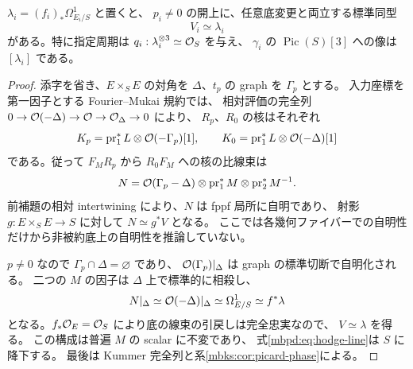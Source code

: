 \begin{lemma}
\label{mbpd:lem:hodge-line}
$\lambda_i=(f_i)_*\Omega^1_{E_i/S}$ と置くと、
$p_i\ne0$ の開上に、任意底変更と両立する標準同型
\begin{equation}\label{mbpd:eq:hodge-line}
 V_i\simeq\lambda_i
\end{equation}
がある。特に指定周期は $q_i:\lambda_i^{\otimes3}\simeq\mathcal O_S$ を与え、
$\gamma_i$ の $\operatorname{Pic}(S)[3]$ への像は $[\lambda_i]$ である。
\end{lemma}
\begin{proof}
添字を省き、$E\times_SE$ の対角を $\Delta$、$t_p$ の graph を $\Gamma_p$ とする。
入力座標を第一因子とする Fourier--Mukai 規約では、
相対評価の完全列
$0\to\mathcal O(-\Delta)\to\mathcal O\to\mathcal O_\Delta\to0$ により、
$R_p$、$R_0$ の核はそれぞれ
\[
 K_p=\operatorname{pr}_1^*L\otimes\mathcal O(-\Gamma_p)[1],
 \qquad K_0=\operatorname{pr}_1^*L\otimes\mathcal O(-\Delta)[1]
\]
である。従って $F_MR_p$ から $R_0F_M$ への核の比線束は
\begin{equation}\label{mbpd:eq:kernel-ratio}
 N=\mathcal O(\Gamma_p-\Delta)\otimes
       \operatorname{pr}_1^*M\otimes\operatorname{pr}_2^*M^{-1}.
\end{equation}
前補題の相対 intertwining により、$N$ は fppf 局所に自明であり、
射影 $g:E\times_SE\to S$ に対して
$N\simeq g^*V$ となる。
ここでは各幾何ファイバーでの自明性だけから非被約底上の自明性を推論していない。

$p\ne0$ なので $\Gamma_p\cap\Delta=\varnothing$ であり、
$\mathcal O(\Gamma_p)|_\Delta$ は graph の標準切断で自明化される。
二つの $M$ の因子は $\Delta$ 上で標準的に相殺し、
\[
 N|_\Delta\simeq\mathcal O(-\Delta)|_\Delta
       \simeq\Omega^1_{E/S}\simeq f^*\lambda
\]
となる。$f_*\mathcal O_E=\mathcal O_S$ により底の線束の引戻しは完全忠実なので、
$V\simeq\lambda$ を得る。
この構成は普遍 $M$ の scalar に不変であり、
式\eqref{mbpd:eq:hodge-line}は $S$ に降下する。
最後は Kummer 完全列と系\ref{mbks:cor:picard-phase}による。
\end{proof}

